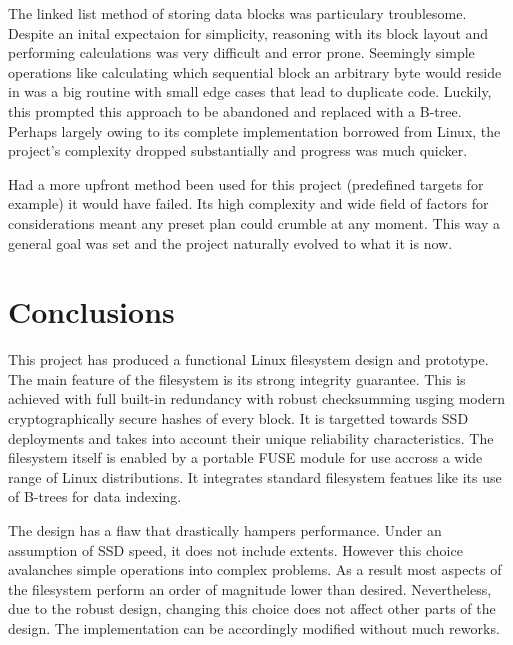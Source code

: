         The linked list method of storing data blocks was particulary
        troublesome. Despite an inital expectaion for simplicity, reasoning
        with its block layout and performing calculations was very difficult
        and error prone. Seemingly simple operations like calculating which
        sequential block an arbitrary byte would reside in was a big routine
        with small edge cases that lead to duplicate code. Luckily, this
        prompted this approach to be abandoned and replaced with a B-tree.
        Perhaps largely owing to its complete implementation borrowed from
        Linux, the project's complexity dropped substantially and progress was
        much quicker.

        Had a more upfront method been used for this project (predefined
        targets for example) it would have failed. Its high complexity and wide
        field of factors for considerations meant any preset plan could crumble
        at any moment. This way a general goal was set and the project
        naturally evolved to what it is now.

    \section{Conclusions}

        This project has produced a functional Linux filesystem design and
        prototype. The main feature of the filesystem is its strong integrity
        guarantee. This is achieved with full built-in redundancy with robust
        checksumming usging modern cryptographically secure hashes of every
        block. It is targetted towards SSD deployments and takes into account
        their unique reliability characteristics. The filesystem itself is
        enabled by a portable FUSE module for use accross a wide range of Linux
        distributions. It integrates standard filesystem featues like its use
        of B-trees for data indexing.

        The design has a flaw that drastically hampers performance. Under an
        assumption of SSD speed, it does not include extents. However this
        choice avalanches simple operations into complex problems. As a result
        most aspects of the filesystem perform an order of magnitude lower than
        desired. Nevertheless, due to the robust design, changing this choice
        does not affect other parts of the design. The implementation can be
        accordingly modified without much reworks.

